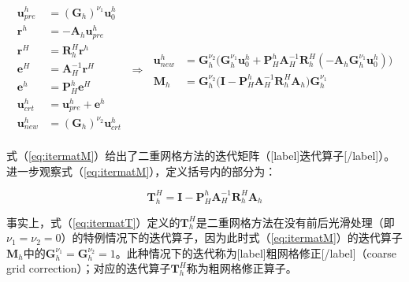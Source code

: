 \documentclass[12pt, UTF8, nofonts]{ctexart}
\begin{document}
\begin{equation}
  \label{eq:itermatM}
  \begin{aligned}
    \boldsymbol{u}^h_{pre} &= (\boldsymbol{G}_{h})^{\nu_1}\boldsymbol{u}_{0}^{h} \\
    \boldsymbol{r}^h &= - \boldsymbol{A}_h\boldsymbol{u}^h_{pre} \\
    \boldsymbol{r}^{H} &= \boldsymbol{R}_{h}^{H}\boldsymbol{r}^h \\
    \boldsymbol{e}^{H} &= \boldsymbol{A}^{-1}_{H}\boldsymbol{r}^{H} \\
    \boldsymbol{e}^{h} &= \boldsymbol{P}^{h}_{H}\boldsymbol{e}^{H} \\
    \boldsymbol{u}^h_{crt} &= \boldsymbol{u}^{h}_{pre} + \boldsymbol{e}^h \\
    \boldsymbol{u}^{h}_{new} &= (\boldsymbol{G}_h)^{\nu_2} \boldsymbol{u}_{crt}^h \\
  \end{aligned} \;\Rightarrow\;
  \begin{aligned}
    \boldsymbol{u}^h_{new} &= \boldsymbol{G}_h^{\nu_2}\Big(\boldsymbol{G}_h^{\nu_1}\boldsymbol{u}_0^h + \boldsymbol{P}_H^h\boldsymbol{A}_H^{-1}\boldsymbol{R}_{h}^{H} \left(-\boldsymbol{A}_h\boldsymbol{G}_h^{\nu_1}\boldsymbol{u}_0^h\right)\Big) \\
    \boldsymbol{M}_h &= \boldsymbol{G}_{h}^{\nu_2}\Big( \boldsymbol{I} - \boldsymbol{P}_H^{h}\boldsymbol{A}_{H}^{-1}\boldsymbol{R}_{h}^{H}\boldsymbol{A}_h \Big)\boldsymbol{G}_{h}^{\nu_1}
  \end{aligned}
\end{equation}

式（\ref{eq:itermatM}）给出了二重网格方法的迭代矩阵（[label]迭代算子[/label]）。进一步观察式（\ref{eq:itermatM}），定义括号内的部分为：

\begin{equation}
  \label{eq:itermatT}
  \boldsymbol{T}_h^H = \boldsymbol{I} - \boldsymbol{P}_{H}^{h}\boldsymbol{A}^{-1}_{H}\boldsymbol{R}_{h}^{H}\boldsymbol{A}_h
\end{equation}

事实上，式（\ref{eq:itermatT}）定义的$\boldsymbol{T}_{h}^{H}$是二重网格方法在没有前后光滑处理（即$\nu_1=\nu_2=0$）的特例情况下的迭代算子，因为此时式（\ref{eq:itermatM}）的迭代算子$\boldsymbol{M}_h$中的$\boldsymbol{G}_{h}^{\nu_1}=\boldsymbol{G}_h^{\nu_2}=1$。此种情况下的迭代称为[label]粗网格修正[/label]（coarse grid correction）；对应的迭代算子$\boldsymbol{T}_{h}^{H}$称为粗网格修正算子。
\end{document}
